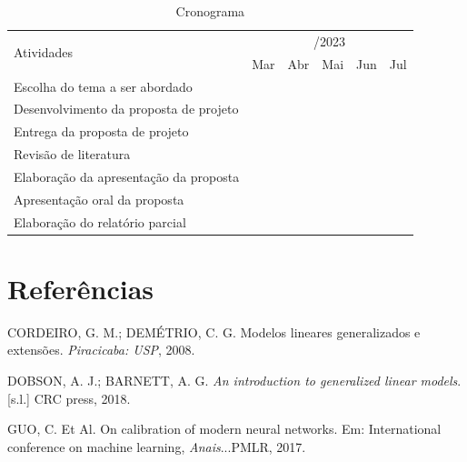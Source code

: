 \documentclass[12pt, a4paper, twoside]{article}
\numberwithin{equation}{subsection} %
\newlength{\cslhangindent}
\newlength{\cslentryspacingunit} %
\newenvironment{CSLReferences}[2] %
 {%
  \setlength{\parindent}{0pt}
  \ifodd #1
  \let\oldpar\par
  \def\par{\hangindent=\cslhangindent\oldpar}
  \fi
  \setlength{\parskip}{#2\cslentryspacingunit}
 }%
 {}
\begin{document}
\begin{table}[H]
\centering
\footnotesize
\caption{Cronograma}
\begin{tabular}{|l|c|c|c|c|c|} \hline
\multirow{2}{*}{Atividades} & \multicolumn{5}{c|}{/2023} \\ \cline{2-6}              
& Mar & Abr & Mai & Jun & Jul \\ \hline 

Escolha do tema a ser abordado    & \cellcolor{midgray} & \cellcolor{midgray} & & & \\ \hline
Desenvolvimento da proposta de projeto & & \cellcolor{midgray} & & &\\ \hline     
Entrega da proposta de projeto      &  &  & \cellcolor{midgray} & &\\ \hline        
Revisão de literatura     & & & \cellcolor{midgray} & \cellcolor{midgray} & \cellcolor{midgray} \\ \hline      
Elaboração da apresentação da proposta    & & & & & \cellcolor{midgray} \\ \hline        
Apresentação oral da proposta    & & & & & \cellcolor{midgray}\\ \hline        
Elaboração do relatório parcial  & & & & & \cellcolor{midgray} \\ \hline


\end{tabular}
\end{table}

\newpage

\hypertarget{referuxeancias}{%
\section{Referências}\label{referuxeancias}}

\hypertarget{refs}{}
\begin{CSLReferences}{0}{0}
\leavevmode{}%
CORDEIRO, G. M.; DEMÉTRIO, C. G. Modelos lineares generalizados e
extens{õ}es. \emph{Piracicaba: USP}, 2008.

\leavevmode{}%
DOBSON, A. J.; BARNETT, A. G. \emph{An introduction to generalized
linear models}. {[}s.l.{]} CRC press, 2018.

\leavevmode{}%
GUO, C. Et Al. On calibration of modern neural networks. Em:
International conference on machine learning, \emph{Anais}...PMLR, 2017.

\end{CSLReferences}






\end{document}
